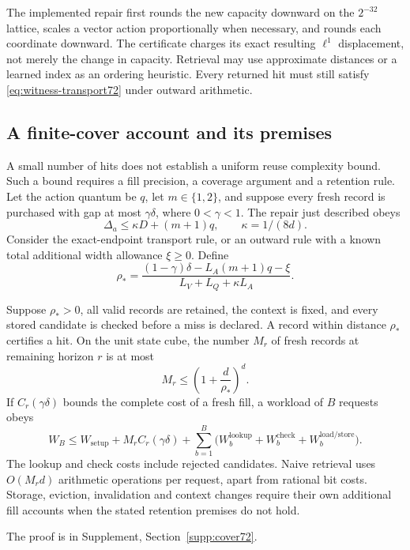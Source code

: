 The implemented repair first rounds the new capacity downward on the $2^{-32}$ lattice, scales a vector action proportionally when necessary, and rounds each coordinate downward. The certificate charges its exact resulting $\ell^1$ displacement, not merely the change in capacity. Retrieval may use approximate distances or a learned index as an ordering heuristic. Every returned hit must still satisfy \eqref{eq:witness-transport72} under outward arithmetic.

\subsection{A finite-cover account and its premises}
A small number of hits does not establish a uniform reuse complexity bound. Such a bound requires a fill precision, a coverage argument and a retention rule. Let the action quantum be $q$, let $m\in\{1,2\}$, and suppose every fresh record is purchased with gap at most $\gamma\delta$, where $0<\gamma<1$. The repair just described obeys
\[
 \Delta_a\le\kappa D+(m+1)q,\qquad \kappa=1/(8d).
\]
Consider the exact-endpoint transport rule, or an outward rule with a known total additional width allowance $\xi\ge0$. Define
\begin{equation}\label{eq:reuse-radius72}
 \rho_*=
 \frac{(1-\gamma)\delta-L_A(m+1)q-\xi}
      {L_V+L_Q+\kappa L_A}.
\end{equation}

\begin{proposition}\label{prop:cover72}
Suppose $\rho_*>0$, all valid records are retained, the context is fixed, and every stored candidate is checked before a miss is declared. A record within distance $\rho_*$ certifies a hit. On the unit state cube, the number $M_r$ of fresh records at remaining horizon $r$ is at most
\begin{equation}\label{eq:packing72}
 M_r\le\left(1+\frac d{\rho_*}\right)^d.
\end{equation}
If $C_r(\gamma\delta)$ bounds the complete cost of a fresh fill, a workload of $B$ requests obeys
\begin{equation}\label{eq:reuse-work72}
 W_B\le W_{\mathrm{setup}}+M_rC_r(\gamma\delta)
       +\sum_{b=1}^B\bigl(W_b^{\mathrm{lookup}}+W_b^{\mathrm{check}}
                     +W_b^{\mathrm{load/store}}\bigr).
\end{equation}
The lookup and check costs include rejected candidates. Naive retrieval uses $O(M_rd)$ arithmetic operations per request, apart from rational bit costs. Storage, eviction, invalidation and context changes require their own additional fill accounts when the stated retention premises do not hold.
\end{proposition}
\noindent The proof is in Supplement, Section~\ref{supp:cover72}.

